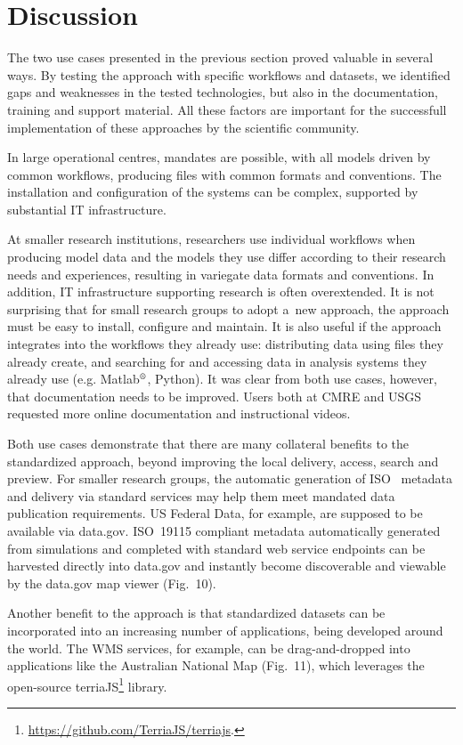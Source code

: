 \documentclass[osd, online, hvmath]{copernicus}
\begin{document}
\section{Discussion}

The two use cases presented in the previous section proved valuable
in several ways. By testing the approach with specific workflows and
datasets, we identified gaps and weaknesses in the tested
technologies, but also in the documentation, training and support
material. All these factors are important for the successfull implementation of these
approaches by the scientific community.

In large operational centres, mandates are possible, with all models
driven by common workflows, producing files with common formats and
conventions.  The installation and configuration of the systems can be
complex, supported by substantial IT infrastructure.

At smaller research institutions, researchers use individual workflows
when producing model data and the models they use differ according to
their research needs and experiences, resulting in variegate data
formats and conventions. In addition, IT infrastructure supporting
research is often overextended. It is not surprising that for small
research groups to adopt a~new approach, the approach must be easy to
install, configure and maintain.  It is also useful if the approach
integrates into the workflows they already use: distributing data
using files they already create, and searching for and accessing data
in analysis systems they already use (e.g.
Matlab$^{\text{\textregistered}}$, Python). It was clear from both use
cases, however, that documentation needs to be improved. Users both at
CMRE and USGS requested more online documentation and instructional
videos.

Both use cases demonstrate that there are many collateral benefits to
the standardized approach, beyond improving the local delivery,
access, search and preview. For smaller research groups, the automatic
generation of ISO~ metadata and delivery via standard services may help
them meet mandated data publication requirements. US Federal Data, for
example, are supposed to be available via data.gov. ISO~19115
compliant metadata automatically generated from simulations and
completed with standard web service endpoints can be harvested
directly into data.gov and instantly become discoverable and viewable
by the data.gov map viewer (Fig.~10).

Another benefit to the approach is that standardized datasets can be
incorporated into an increasing number of applications, being developed around
the world.  The WMS services, for example, can be drag-and-dropped
into applications like the Australian National Map (Fig.~11), which
leverages the open-source
terriaJS\footnote{\url{https://github.com/TerriaJS/terriajs}.}
library.
\end{document}
